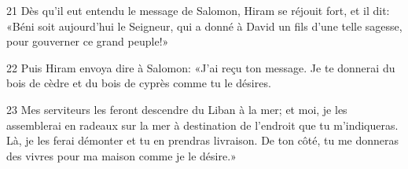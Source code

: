 
21 Dès qu’il eut entendu le message de Salomon, Hiram se réjouit fort, et il dit: «Béni soit aujourd’hui le Seigneur, qui a donné à David un fils d’une telle sagesse, pour gouverner ce grand peuple!»

22 Puis Hiram envoya dire à Salomon: «J’ai reçu ton message. Je te donnerai du bois de cèdre et du bois de cyprès comme tu le désires.

23 Mes serviteurs les feront descendre du Liban à la mer; et moi, je les assemblerai en radeaux sur la mer à destination de l’endroit que tu m’indiqueras. Là, je les ferai démonter et tu en prendras livraison. De ton côté, tu me donneras des vivres pour ma maison comme je le désire.»
